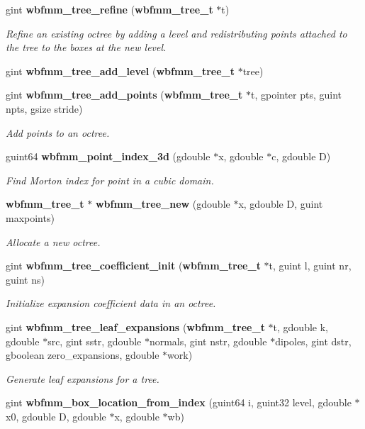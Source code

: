 \begin{DoxyCompactItemize}
gint {\bf wbfmm\+\_\+tree\+\_\+refine} ({\bf wbfmm\+\_\+tree\+\_\+t} $\ast$t)
\begin{DoxyCompactList}\small\item\em Refine an existing octree by adding a level and redistributing points attached to the tree to the boxes at the new level. \end{DoxyCompactList}\item 
gint {\bf wbfmm\+\_\+tree\+\_\+add\+\_\+level} ({\bf wbfmm\+\_\+tree\+\_\+t} $\ast$tree)
\item 
gint {\bf wbfmm\+\_\+tree\+\_\+add\+\_\+points} ({\bf wbfmm\+\_\+tree\+\_\+t} $\ast$t, gpointer pts, guint npts, gsize stride)
\begin{DoxyCompactList}\small\item\em Add points to an octree. \end{DoxyCompactList}\item 
guint64 {\bf wbfmm\+\_\+point\+\_\+index\+\_\+3d} (gdouble $\ast$x, gdouble $\ast$c, gdouble D)
\begin{DoxyCompactList}\small\item\em Find Morton index for point in a cubic domain. \end{DoxyCompactList}\item 
{\bf wbfmm\+\_\+tree\+\_\+t} $\ast$ {\bf wbfmm\+\_\+tree\+\_\+new} (gdouble $\ast$x, gdouble D, guint maxpoints)
\begin{DoxyCompactList}\small\item\em Allocate a new octree. \end{DoxyCompactList}\item 
gint {\bf wbfmm\+\_\+tree\+\_\+coefficient\+\_\+init} ({\bf wbfmm\+\_\+tree\+\_\+t} $\ast$t, guint l, guint nr, guint ns)
\begin{DoxyCompactList}\small\item\em Initialize expansion coefficient data in an octree. \end{DoxyCompactList}\item 
gint {\bf wbfmm\+\_\+tree\+\_\+leaf\+\_\+expansions} ({\bf wbfmm\+\_\+tree\+\_\+t} $\ast$t, gdouble k, gdouble $\ast$src, gint sstr, gdouble $\ast$normals, gint nstr, gdouble $\ast$dipoles, gint dstr, gboolean zero\+\_\+expansions, gdouble $\ast$work)
\begin{DoxyCompactList}\small\item\em Generate leaf expansions for a tree. \end{DoxyCompactList}\item 
gint {\bf wbfmm\+\_\+box\+\_\+location\+\_\+from\+\_\+index} (guint64 i, guint32 level, gdouble $\ast$x0, gdouble D, gdouble $\ast$x, gdouble $\ast$wb)

\end{DoxyCompactItemize}
